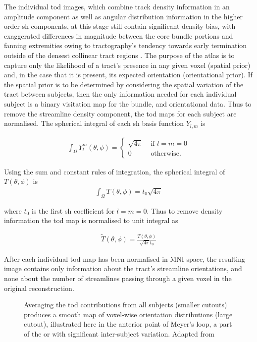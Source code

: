 The individual \gls{tod} images, which combine track density information in an amplitude component as well as angular distribution information in the higher order \gls{sh} components, at this stage still contain significant density bias, with exaggerated differences in magnitude between the core bundle portions and fanning extremities owing to tractography's tendency towards early termination outside of the densest collinear tract regions \autocite{Smith2013,Calamante2015,Rheault2020}.
The purpose of the atlas is to capture only the likelihood of a tract's presence in any given voxel (spatial prior) and, in the case that it is present, its expected orientation (orientational prior).
If the spatial prior is to be determined by considering the spatial variation of the tract between subjects, then the only information needed for each individual subject is a binary visitation map for the bundle, and orientational data.
Thus to remove the streamline density component, the \gls{tod} maps for each subject are normalised.
The spherical integral of each \gls{sh} basis function $Y_{l,m}$ is

\begin{align}
  \int_{\Omega} Y^m_l(\theta, \phi) = \begin{cases}
   \sqrt{4\pi} & \text{ if } l=m=0\\
   0 & \text{ otherwise. }
  \end{cases}
\end{align}

Using the sum and constant rules of integration, the spherical integral of $T(\theta,\phi)$ is
\begin{align}
  \int_{\Omega} T(\theta,\phi) = t_0 \sqrt{4\pi}
\end{align}

where $t_0$ is the first \gls{sh} coefficient for $l=m=0$. Thus to remove density information the \gls{tod} map is normalised to unit integral as

\begin{align}
  \widetilde{T}(\theta, \phi) = \frac{T(\theta,\phi)}{\sqrt{4\pi} t_0}
\end{align}

After each individual \gls{tod} map has been normalised in MNI space, the resulting image contains only information about the tract's streamline orientations, and none about the number of streamlines passing through a given voxel in the original reconstruction.

\begin{SCfigure}
  
  \caption[TOD averaging to create and atlas]{Averaging the \gls{tod} contributions from all subjects (smaller cutouts) produces a smooth map of voxel-wise orientation distributions (large cutout), illustrated here in the anterior point of Meyer's loop, a part of the \gls{or} with significant inter-subject variation. Adapted from \textcite{Young2024}}
  \label{fig:todmean}
\end{SCfigure}

